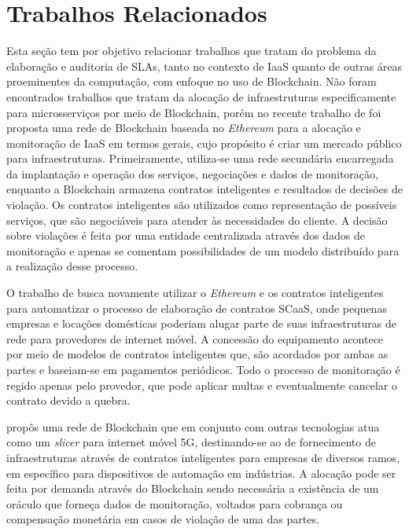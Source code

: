 
\section{Trabalhos Relacionados}
\label{sec:trabalhos_relacionados}

Esta seção tem por objetivo relacionar trabalhos que tratam do problema da elaboração e auditoria de \acp{SLA}, tanto no contexto de \ac{IaaS} quanto de outras áreas proeminentes da computação, com enfoque no uso de Blockchain.
%
Não foram encontrados trabalhos que tratam da alocação de infraestruturas especificamente para microsserviços por meio de Blockchain, porém no recente trabalho de  foi proposta uma rede de Blockchain baseada no \textit{Ethereum} para a alocação e monitoração de \ac{IaaS} em termos gerais, cujo propósito é criar um mercado público para infraestruturas. Primeiramente, utiliza-se uma rede secundária encarregada da implantação e operação dos serviços, negociações e dados de monitoração, enquanto a Blockchain armazena contratos inteligentes e resultados de decisões de violação. Os contratos inteligentes são utilizados como representação de possíveis serviços, que são negociáveis para atender às necessidades do cliente. A decisão sobre violações é feita por uma entidade centralizada através dos dados de monitoração e apenas se comentam possibilidades de um modelo distribuído para a realização desse processo.

%
O trabalho de  busca novamente utilizar o \textit{Ethereum} e os contratos inteligentes para automatizar o processo de elaboração de contratos \ac{SCaaS}, onde pequenas empresas e locações domésticas poderiam alugar parte de suas infraestruturas de rede para provedores de internet móvel. A concessão do equipamento acontece por meio de modelos de contratos inteligentes que, são acordados por ambas as partes e baseiam-se em pagamentos periódicos. Todo o processo de monitoração é regido apenas pelo provedor, que pode aplicar multas e eventualmente cancelar o contrato devido a quebra.

 propôs uma rede de Blockchain que em conjunto com outras tecnologias atua como um \textit{slicer} para internet móvel 5G, destinando-se ao de fornecimento de infraestruturas através de contratos inteligentes para empresas de diversos ramos, em específico para dispositivos de automação em indústrias. A alocação pode ser feita por demanda através do Blockchain sendo necessária a existência de um oráculo que forneça dados de monitoração, voltados para cobrança ou compensação monetária em casos de violação de uma das partes.

